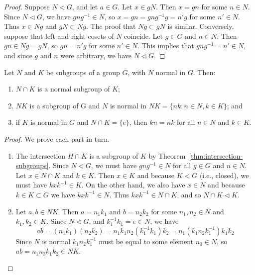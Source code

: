 \begin{proof}
    Suppose \(N \triangleleft G\), and let \(a \in G\). Let \(x \in gN\). Then
    \(x = gn\) for some \(n \in N\). Since \(N \triangleleft G\), we have
    \(gng^{-1} \in N\), so \(x = gn = gng^{-1}g = n'g\) for some \(n' \in N\).
    Thus \(x \in Ng\) and \(gN \subset Ng\). The proof that \(Ng \subset gN\) is
    similar. Conversely, suppose that left and right cosets of \(N\) coincide.
    Let \(g \in G\) and \(n \in N\). Then \(gn \in Ng = gN\), so \(gn = n'g\)
    for some \(n' \in N\). This implies that \(gng^{-1} = n' \in N\), and since
    \(g\) and \(n\) were arbitrary, we have \(N \triangleleft G\).
\end{proof}

\begin{theorem}
    \label{thm:normal-subgroup-props}
    Let \(N\) and \(K\) be subgroups of a group \(G\), with \(N\) normal in
    \(G\). Then:
    \begin{enumerate}[label=(\alph*)]
        \item \(N \cap K\) is a normal subgroup of \(K\);
        \item \(NK\) is a subgroup of G and \(N\) is normal in \(NK = \{nk : n
        \in N, k \in K\}\); and
        \item if \(K\) is normal in \(G\) and \(N \cap K = \{e\}\), then \(kn =
        nk\) for all \(n \in N\) and \(k \in K\).
    \end{enumerate}
\end{theorem}

\begin{proof}
    We prove each part in turn.
    \begin{enumerate}[label=(\alph*), wide]
        \item The intersection \(H \cap K\) is a subgroup of \(K\) by
        Theorem~\ref{thm:intersection-subgroups}. Since \(N \triangleleft G\),
        we must have \(gng^{-1} \in N\) for all \(g \in G\) and \(n \in N\). Let
        \(x \in N \cap K\) and \(k \in K\). Then \(x \in K\) and because \(K <
        G\) (i.e., closed), we must have \(kxk^{-1} \in K\). On the other hand,
        we also have \(x \in N\) and because \(k \in K \subset G\) we have
        \(kxk^{-1} \in N\). Thus \(kxk^{-1} \in N \cap K\), and so \(N \cap K
        \triangleleft K\).
        
        \item Let \(a, b \in NK\). Then \(a = n_1k_1\) and \(b = n_2k_2\) for
        some \(n_1, n_2 \in N\) and \(k_1, k_2 \in K\). Since \(N \triangleleft
        G\), and \(k^{-1}_1k_1 = e \in N\), we have
        \[
            ab = (n_1k_1)(n_2k_2) = n_1k_1n_2(k^{-1}_1k_1)k_2 = n_1(k_1n_2k^{-1}_1)k_1k_2
        \]
        Since \(N\) is normal \(k_1n_2k^{-1}_1\) must be equal to some element
        \(n_3 \in N\), so \(ab = n_1n_3k_1k_2 \in NK\).
    \end{enumerate}
\end{proof}

